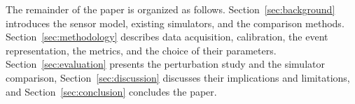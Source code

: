 The remainder of the paper is organized as follows. Section~\ref{sec:background} introduces the sensor model, existing simulators, and the comparison methods. Section~\ref{sec:methodology} describes data acquisition, calibration, the event representation, the metrics, and the choice of their parameters. Section~\ref{sec:evaluation} presents the perturbation study and the simulator comparison, Section~\ref{sec:discussion} discusses their implications and limitations, and Section~\ref{sec:conclusion} concludes the paper.
